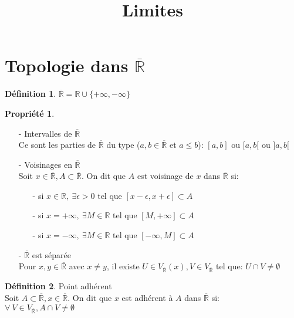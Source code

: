 \documentclass[fleqn]{article}
\title{Limites}
\date{}
\theoremstyle{definition} \newtheorem*{defi}{D\'efinition}
\theoremstyle{definition} \newtheorem*{theo}{Th\'eor\`eme}
\theoremstyle{definition} \newtheorem*{prop}{Propri\'et\'e}
\theoremstyle{remark} \newtheorem*{rqs}{Remarques}
\begin{document}
\maketitle

\section{Topologie dans $\overline{\mathbb{R}}$}
\begin{defi}
	$\overline{\mathbb{R}} = \mathbb{R} \cup \{ +\infty, -\infty\}$
\end{defi}

\begin{prop} $ $
	\begin{itemize}
		\item [-] Intervalles de $\overline{\mathbb{R}}$ \\
			Ce sont les parties de $\overline{\mathbb{R}}$ du type ($a,b \in \overline{\mathbb{R}}$ et $a \leq b$): $[a,b]$ ou $[a,b[$ ou $]a,b[$
		\item [-] Voisinages en $\overline{\mathbb{R}}$ \\
			Soit $x \in \overline{\mathbb{R}}, A \subset \overline{\mathbb{R}}$. On dit que $A$ est voisinage de $x$ dans
			$\overline{\mathbb{R}}$ si:
				\begin{itemize}
					\item[-] si $x \in \mathbb{R},\ \exists \epsilon > 0$ tel que $[x - \epsilon, x + \epsilon] \subset A$
					\item[-] si $x = +\infty,\ \exists M \in \mathbb{R}$ tel que $[M, +\infty] \subset A$
					\item[-] si $x = - \infty,\ \exists M \in \mathbb{R}$ tel que $[-\infty, M] \subset A$
				\end{itemize}
		\item [-]  $\overline{\mathbb{R}}$ est s\'epar\'ee \\
			Pour $x, y \in \overline{\mathbb{R}}$ avec $x \neq y$, il existe $U \in V_{\overline{\mathbb{R}}%
			}(x), V \in V_{\overline{\mathbb{R}}%
			}$ tel que: $U \cap V \neq \emptyset$
	\end{itemize}
\end{prop}

\begin{defi} Point adh\'erent \\
		Soit $A \subset \overline{\mathbb{R}}, x \in \overline{\mathbb{R}}$. On dit que $x$ est adh\'erent \`a $A$ dans
		$\overline{\mathbb{R}}$ si: \\
		$\forall\ V \in V_{\overline{\mathbb{R}}%
		}, A \cap V \neq \emptyset$
\end{defi}
\end{document}
